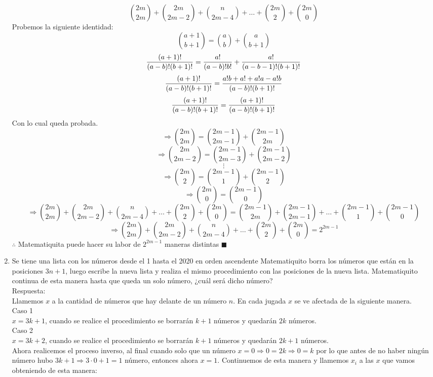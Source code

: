 \documentclass{book}
\begin{document}
\begin{enumerate}
          $${2m \choose 2m}+{2m \choose 2m-2}+{n \choose 2m-4}+\ldots+{2m \choose 2}+{2m \choose 0}$$
          Probemos la siguiente identidad:
          $${a+1 \choose b+1}={a \choose b}+{a \choose b+1}$$
          $${(a+1)!\over (a-b)!(b+1)!}={a!\over (a-b)!b!}+{a!\over (a-b-1)!(b+1)!}$$
          $${(a+1)!\over (a-b)!(b+1)!}=\frac{a!b+a!+a!a-a!b}{(a-b)!(b+1)!}$$
          $${(a+1)!\over (a-b)!(b+1)!}={(a+1)!\over (a-b)!(b+1)!}$$
          Con lo cual queda probada.
          $$\Rightarrow {2m \choose 2m}={2m-1 \choose 2m-1}+{2m-1 \choose 2m}$$
          $$\Rightarrow {2m \choose 2m-2}={2m-1 \choose 2m-3}+{2m-1 \choose 2m-2}$$
          $$\vdots$$
          $$\Rightarrow {2m \choose 2}={2m-1 \choose 1}+{2m-1 \choose 2}$$
          $$\Rightarrow{2m \choose 0}={2m-1 \choose 0}$$
          $$\Rightarrow {2m \choose 2m}+{2m \choose 2m-2}+{n \choose 2m-4}+\ldots+{2m \choose 2}+{2m \choose 0}={2m-1 \choose 2m}+{2m-1 \choose 2m-1}+\ldots +{2m-1 \choose 1}+{2m-1 \choose 0}$$
          $$\Rightarrow {2m \choose 2m}+{2m \choose 2m-2}+{n \choose 2m-4}+\ldots+{2m \choose 2}+{2m \choose 0}=2^{2m-1}$$
          $\therefore$ Matematiquita puede hacer su labor de $2^{2m-1}$ maneras distintas $\blacksquare$\\
    \item Se tiene una lista con los números desde el 1 hasta el 2020 en orden ascendente Matematiquito borra los números que están en la posiciones $3n+1$, luego escribe la nueva lista y realiza el mismo procedimiento con las posiciones de la nueva lista. Matematiquito continua de esta manera hasta que queda un solo número, ¿cuál será dicho número?\\
          Respuesta:\\
          Llamemos $x$ a la cantidad de números que hay delante de un número $n$. En cada jugada $x$ se ve afectada de la siguiente manera.\\
          Caso 1\\
          $x=3k+1$, cuando se realice el procedimiento se borrarán $k+1$ números y quedarán $2k$ números.\\
          Caso 2\\
          $x=3k+2$, cuando se realice el procedimiento se borrarán $k+1$ números y quedarán $2k+1$ números.\\
          Ahora realicemos el proceso inverso, al final cuando solo que un número $x=0\Rightarrow 0=2k\Rightarrow 0=k$ por lo que antes de no haber ningún número hubo $3k+1\Rightarrow 3\cdot 0+1=1$ número, entonces ahora $x=1$. Continuemos de esta manera y llamemos $x_i$ a las $x$ que vamos obteniendo de esta manera:

\end{enumerate}
\end{document}
